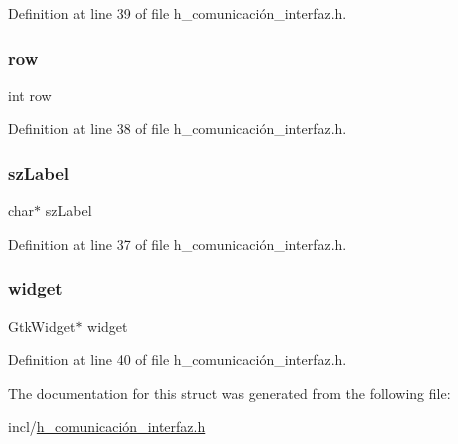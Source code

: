 Definition at line 39 of file h\+\_\+comunicación\+\_\+interfaz.\+h.

\mbox{\label{struct_mo_button_af1d3cff2e4538e23400e260bae3dadad}} 
\subsubsection{\texorpdfstring{row}{row}}
{\footnotesize\ttfamily int row}



Definition at line 38 of file h\+\_\+comunicación\+\_\+interfaz.\+h.

\mbox{\label{struct_mo_button_a7edf7c4d9e07404c9e94471a15615342}} 
\subsubsection{\texorpdfstring{sz\+Label}{szLabel}}
{\footnotesize\ttfamily char$\ast$ sz\+Label}



Definition at line 37 of file h\+\_\+comunicación\+\_\+interfaz.\+h.

\mbox{\label{struct_mo_button_aca344d357e68756eaeca7eca04111438}} 
\subsubsection{\texorpdfstring{widget}{widget}}
{\footnotesize\ttfamily Gtk\+Widget$\ast$ widget}



Definition at line 40 of file h\+\_\+comunicación\+\_\+interfaz.\+h.



The documentation for this struct was generated from the following file\+:\begin{DoxyCompactItemize}
\item 
incl/\hyperlink{h__comunicaci_xC3_xB3n__interfaz_8h}{h\+\_\+comunicación\+\_\+interfaz.\+h}\end{DoxyCompactItemize}
